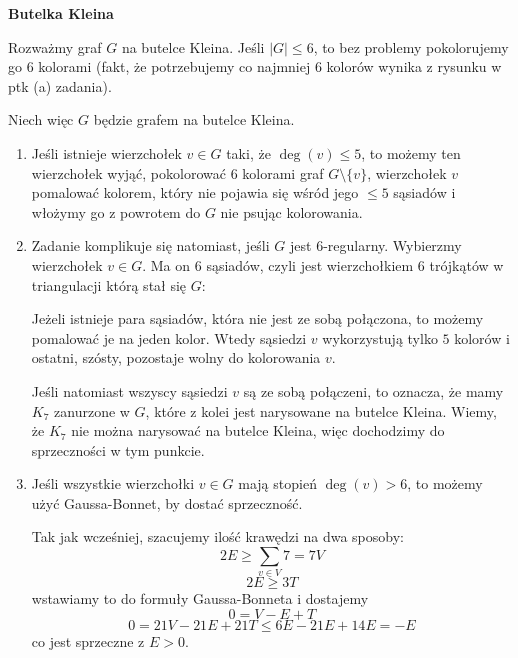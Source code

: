 \begin{enumerate}[label=\textbf{(\alph*)}]
    \textbf{Butelka Kleina} \dotfill

  Rozważmy graf $G$ na butelce Kleina. Jeśli $|G|\leq 6$, to bez problemy pokolorujemy go $6$ kolorami (fakt, że potrzebujemy co najmniej $6$ kolorów wynika z rysunku w ptk (a) zadania). 

  Niech więc $G$ będzie grafem na butelce Kleina. 
  \begin{enumerate}[label=\arabic*]
    \item Jeśli istnieje wierzchołek $v\in G$ taki, że $\deg(v)\leq 5$, to możemy ten wierzchołek wyjąć, pokolorować $6$ kolorami graf $G\setminus \{v\}$, wierzchołek $v$ pomalować kolorem, który nie pojawia się wśród jego $\leq 5$ sąsiadów i włożymy go z powrotem do $G$ nie psując kolorowania.

    \item Zadanie komplikuje się natomiast, jeśli $G$ jest $6$-regularny. Wybierzmy wierzchołek $v\in G$. Ma on $6$ sąsiadów, czyli jest wierzchołkiem $6$ trójkątów w triangulacji którą stał się $G$:
  \begin{center}\end{center}
  Jeżeli istnieje para sąsiadów, która nie jest ze sobą połączona, to możemy pomalować je na jeden kolor. Wtedy sąsiedzi $v$ wykorzystują tylko $5$ kolorów i ostatni, szósty, pozostaje wolny do kolorowania $v$. 

  Jeśli natomiast wszyscy sąsiedzi $v$ są ze sobą połączeni, to oznacza, że mamy $K_7$ zanurzone w $G$, które z kolei jest narysowane na butelce Kleina. Wiemy, że $K_7$ nie można narysować na butelce Kleina, więc dochodzimy do sprzeczności w tym punkcie.
\item Jeśli wszystkie wierzchołki $v\in G$ mają stopień $\deg(v)>6$, to możemy użyć Gaussa-Bonnet, by dostać sprzeczność.

  Tak jak wcześniej, szacujemy ilość krawędzi na dwa sposoby:
  $$2E\geq \sum_{v\in V}7=7V$$
  $$2E\geq 3T$$
  wstawiamy to do formuły Gaussa-Bonneta i dostajemy
  $$0=V-E+T$$
  $$0=21V-21E+21T\leq 6E-21E+14E=-E$$
  co jest sprzeczne z $E>0$.
\end{enumerate}
\end{enumerate}
